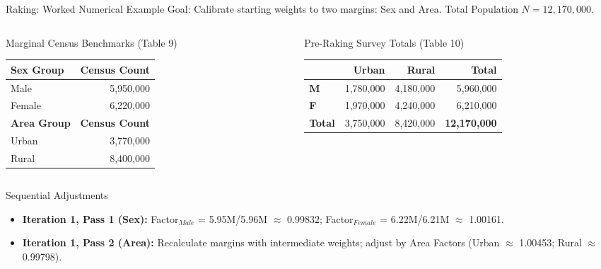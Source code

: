 \documentclass[10pt, aspectratio=169]{beamer}
\begin{document}
\begin{frame}{Raking: Worked Numerical Example}
  Goal: Calibrate starting weights to two margins: Sex and Area. Total Population $N = 12,170,000$.
  
  \begin{columns}[T]
    \begin{column}{0.48\textwidth}
      \begin{block}{Marginal Census Benchmarks (Table 9)}
        \begin{tabular}{lr}
          \textbf{Sex Group} & \textbf{Census Count} \\
          \midrule
          Male & 5,950,000 \\
          Female & 6,220,000 \\
          \midrule
          \textbf{Area Group} & \textbf{Census Count} \\
          \midrule
          Urban & 3,770,000 \\
          Rural & 8,400,000 \\
        \end{tabular}
      \end{block}
    \end{column}
    \begin{column}{0.48\textwidth}
      \begin{block}{Pre-Raking Survey Totals (Table 10)}
        \begin{tabular}{lrrr}
          \toprule
          & \textbf{Urban} & \textbf{Rural} & \textbf{Total} \\
          \midrule
          \textbf{M} & 1,780,000 & 4,180,000 & 5,960,000 \\
          \textbf{F} & 1,970,000 & 4,240,000 & 6,210,000 \\
          \midrule
          \textbf{Total} & 3,750,000 & 8,420,000 & \textbf{12,170,000} \\
          \bottomrule
        \end{tabular}
      \end{block}
    \end{column}
  \end{columns}

  \begin{block}{Sequential Adjustments}
    \begin{itemize}
      \item \textbf{Iteration 1, Pass 1 (Sex):} Factor$_{Male}$ = 5.95M/5.96M $\approx$ 0.99832; Factor$_{Female}$ = 6.22M/6.21M $\approx$ 1.00161.
      \item \textbf{Iteration 1, Pass 2 (Area):} Recalculate margins with intermediate weights; adjust by Area Factors (Urban $\approx$ 1.00453; Rural $\approx$ 0.99798).
    \end{itemize}
  \end{block}
\end{frame}
\end{document}
